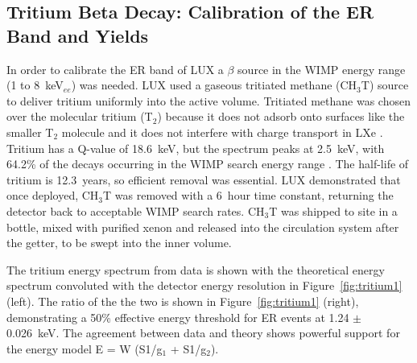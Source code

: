 \FloatBarrier
\subsection{Tritium Beta Decay: Calibration of the ER Band and Yields}
In order to calibrate the \ac{ER} band of \ac{LUX} a $\beta$ source in the \ac{WIMP} energy range (1 to 8~keV$_{ee}$) was needed. \ac{LUX} used a gaseous tritiated methane (CH$_{3}$T) source to deliver tritium uniformly into the active volume. Tritiated methane was chosen over the molecular tritium (T$_{2}$) because it does not adsorb onto surfaces like the smaller T$_{2}$ molecule and it does not interfere with charge transport in \ac{LXe} \cite{LUXTritium}. Tritium has a Q-value of 18.6~keV, but the spectrum peaks at 2.5~keV, with 64.2\% of the decays occurring in the \ac{WIMP} search energy range \cite{LUXTritium}. The half-life of tritium is 12.3~years, so efficient removal was essential. \ac{LUX} demonstrated that once deployed, CH$_{3}$T was removed with a 6~hour time constant, returning the detector back to acceptable \ac{WIMP} search rates. CH$_{3}$T was shipped to site in a bottle, mixed with purified xenon and released into the circulation system after the getter, to be swept into the inner volume. 

The tritium energy spectrum from data is shown with the theoretical energy spectrum convoluted with the detector energy resolution in Figure~\ref{fig:tritium1} (left). The ratio of the the two is shown in Figure~\ref{fig:tritium1} (right), demonstrating a 50\% effective energy threshold for \ac{ER} events at 1.24 $\pm$ 0.026~keV. The agreement between data and theory shows powerful support for the energy model E = W (S1/g$_{1}$ + S1/g$_{2}$). 

